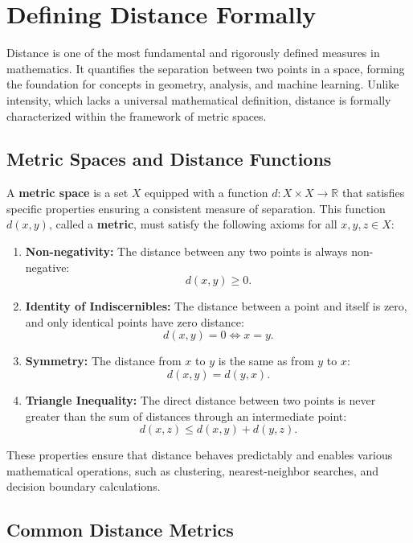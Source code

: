 \section{Defining Distance Formally}

Distance is one of the most fundamental and rigorously defined measures in mathematics. It quantifies the separation between two points in a space, forming the foundation for concepts in geometry, analysis, and machine learning. Unlike intensity, which lacks a universal mathematical definition, distance is formally characterized within the framework of metric spaces.

\subsection{Metric Spaces and Distance Functions}

A \textbf{metric space} is a set \( X \) equipped with a function \( d: X \times X \to \mathbb{R} \) that satisfies specific properties ensuring a consistent measure of separation. This function \( d(x, y) \), called a \textbf{metric}, must satisfy the following axioms for all \( x, y, z \in X \):

\begin{enumerate}
    \item \textbf{Non-negativity:} The distance between any two points is always non-negative:
    \[
    d(x, y) \geq 0.
    \]
    \item \textbf{Identity of Indiscernibles:} The distance between a point and itself is zero, and only identical points have zero distance:
    \[
    d(x, y) = 0 \iff x = y.
    \]
    \item \textbf{Symmetry:} The distance from \( x \) to \( y \) is the same as from \( y \) to \( x \):
    \[
    d(x, y) = d(y, x).
    \]
    \item \textbf{Triangle Inequality:} The direct distance between two points is never greater than the sum of distances through an intermediate point:
    \[
    d(x, z) \leq d(x, y) + d(y, z).
    \]
\end{enumerate}

These properties ensure that distance behaves predictably and enables various mathematical operations, such as clustering, nearest-neighbor searches, and decision boundary calculations.

\subsection{Common Distance Metrics}

